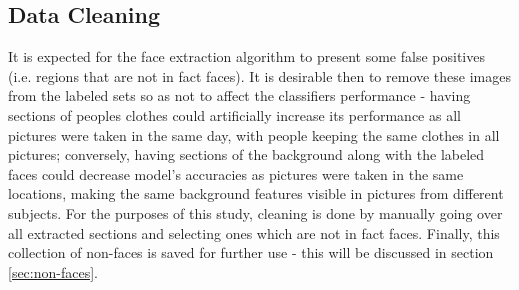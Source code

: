 \documentclass[11pt]{article}
\begin{document}
        \subsection{Data Cleaning}
            It is expected for the face extraction algorithm to present some false positives (i.e. regions that are not in fact faces). It is desirable then to remove these images from the labeled sets so as not to affect the classifiers performance - having sections of peoples clothes could artificially increase its performance as all pictures were taken in the same day, with people keeping the same clothes in all pictures; conversely, having sections of the background along with the labeled faces could decrease model's accuracies as pictures were taken in the same locations, making the same background features visible in pictures from different subjects. For the purposes of this study, cleaning is done by manually going over all extracted sections and selecting ones which are not in fact faces. Finally, this collection of non-faces is saved for further use - this will be discussed in section \ref{sec:non-faces}.
\end{document}
